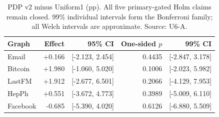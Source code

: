 \begin{table}[htbp]
\centering\small
\caption{PDP v2 minus Uniform1 (pp). All five primary-gated Holm claims remain closed. 99\% individual intervals form the Bonferroni family; all Welch intervals are approximate. Source: U6-A.}\label{tab:effects}
\begin{tabular}{lrrrr}
\toprule
Graph & Effect & 95\% CI & One-sided $p$ & 99\% CI\\ \midrule
Email & +0.166 & [-2.123, 2.454] & 0.4435 & [-2.847, 3.178] \\
Bitcoin & +1.980 & [-1.060, 5.020] & 0.1006 & [-2.023, 5.982] \\
LastFM & +1.912 & [-2.677, 6.501] & 0.2066 & [-4.129, 7.953] \\
HepPh & +0.551 & [-3.672, 4.773] & 0.3989 & [-5.009, 6.110] \\
Facebook & -0.685 & [-5.390, 4.020] & 0.6126 & [-6.880, 5.509] \\
\bottomrule\end{tabular}
\end{table}
